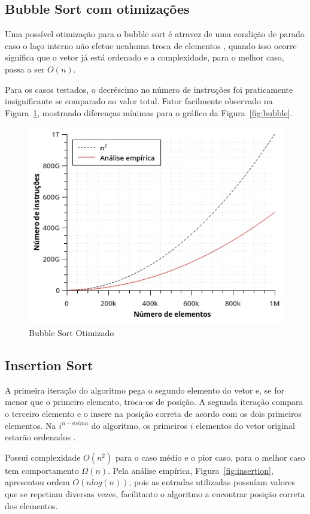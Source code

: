 \subsection{Bubble Sort com otimizações}
Uma possível otimização para o bubble sort é atravez de uma condição de parada caso o laço interno não efetue nenhuma troca de elementos \cite{geeks:01}, quando isso ocorre significa que o vetor já está ordenado e a complexidade, para o melhor caso, passa a ser $O(n)$.

Para os casos testados, o decréscimo no número de instruções foi praticamente insignificante se comparado ao valor total. Fator facilmente observado na Figura~\ref{fig:bubble_optimized}, mostrando diferenças mínimas para o gráfico da Figura~\ref{fig:bubble}.
\begin{figure}[h]
\centering
\includegraphics[scale=0.7]{images/bubble_optimized_graph.jpg}
\caption{Bubble Sort Otimizado}
\label{fig:bubble_optimized}
\end{figure}

\subsection{Insertion Sort}
A primeira iteração do algoritmo pega o segundo elemento do vetor e, se for menor que o primeiro elemento, troca-os de posição. A segunda iteração compara o terceiro elemento e o insere na posição correta de acordo com os dois primeiros elementos. Na $i^{n-ésima}$ do algoritmo, os primeiros $i$ elementos do vetor original estarão ordenados \cite{deitel:01}.

Possui complexidade $O(n^2)$ para o caso médio e o pior caso, para o melhor caso tem comportamento $\Omega(n)$. Pela análise empírica, Figura~\ref{fig:insertion}, apresentou ordem $O(nlog(n))$, pois as entradas utilizadas possuíam valores que se repetiam diversas vezes, facilitanto o algoritmo a encontrar posição correta dos elementos.


